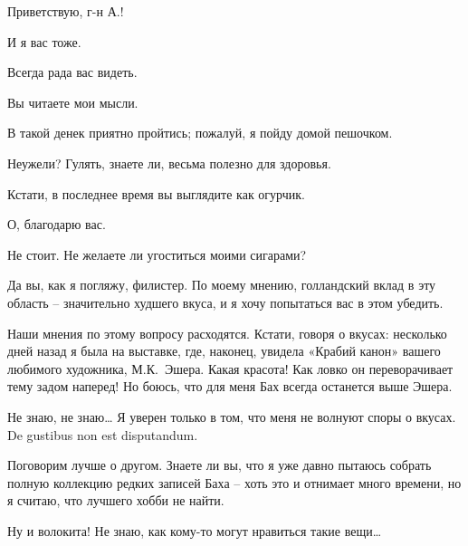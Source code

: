 \documentclass[../main.tex]{subfiles}
\begin{document}


\begin{dialogue}

 Приветствую, г-н А.!

 И я вас тоже.

 Всегда рада вас видеть.

 Вы читаете мои мысли.

 В такой денек приятно пройтись; пожалуй, я пойду домой пешочком.

 Неужели? Гулять, знаете ли, весьма полезно для здоровья.

 Кстати, в последнее время вы выглядите как огурчик.

 О, благодарю вас.

 Не стоит. Не желаете ли угоститься моими сигарами?

 Да вы, как я погляжу, филистер. По моему мнению, голландский вклад в эту область \--- значительно худшего вкуса, и я хочу попытаться вас в этом убедить.

 Наши мнения по этому вопросу расходятся. Кстати, говоря о вкусах: несколько дней назад я была на выставке, где, наконец, увидела «Крабий канон» вашего любимого художника, М.К.~Эшера. Какая красота! Как ловко он переворачивает тему задом наперед! Но боюсь, что для меня Бах всегда останется выше Эшера.

 Не знаю, не знаю\ldots{} Я уверен только в том, что меня не волнуют споры о вкусах. De gustibus non est disputandum.

 Поговорим лучше о другом. Знаете ли вы, что я уже давно пытаюсь собрать полную коллекцию редких записей Баха \--- хоть это и отнимает много времени, но я считаю, что лучшего хобби не найти.

 Ну и волокита! Не знаю, как кому-то могут нравиться такие вещи\ldots{}



\end{dialogue}
\end{document}
